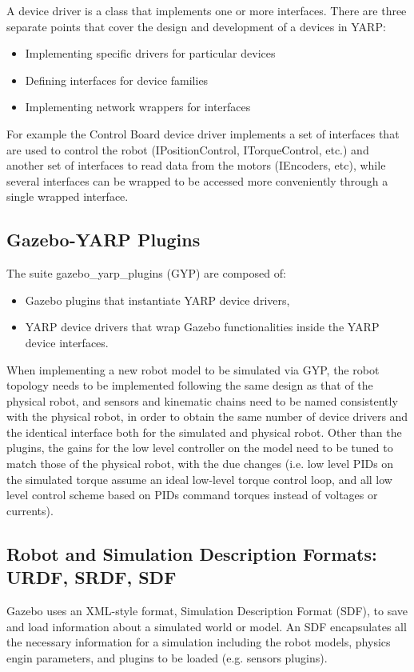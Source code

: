 A device driver is a class that implements one or more interfaces. There are three separate points that cover the design and development of a  devices in YARP:
\begin{itemize}
\item Implementing specific drivers for particular devices
\item Defining interfaces for device families
\item Implementing network wrappers for interfaces
\end{itemize}
For example the Control Board device driver implements a set of interfaces that are used to control the robot (IPositionControl, ITorqueControl, etc.) and another set of interfaces to read data from the motors (IEncoders, etc), while several interfaces can be wrapped to be accessed more conveniently through a single wrapped interface.

\subsection{Gazebo-YARP Plugins}
The suite gazebo\_yarp\_plugins (GYP) are composed of:
\begin{itemize}
    \item Gazebo plugins that instantiate YARP device drivers,
    \item YARP device drivers that wrap Gazebo functionalities inside the YARP device interfaces.
\end{itemize}
When implementing a new robot model to be simulated via GYP, the robot topology needs to be implemented following the same design as that of the physical robot, and sensors and kinematic chains need to be named consistently with the physical robot, in order to obtain the same number of device drivers and the identical interface both for the simulated and physical robot. Other than the plugins, the gains for the low level controller on the model need to be tuned to match those of the physical robot, with the due changes (i.e. low level PIDs on the simulated torque assume an ideal low-level torque control loop, and all low level control scheme based on PIDs command torques instead of voltages or currents).

\subsection{Robot and Simulation Description Formats: URDF, SRDF, SDF}
Gazebo uses an XML-style format, Simulation Description Format (SDF), to save and load information about a simulated world or model. An SDF encapsulates all the necessary information for a simulation including the robot models, physics engin parameters, and plugins to be loaded (e.g. sensors plugins).


